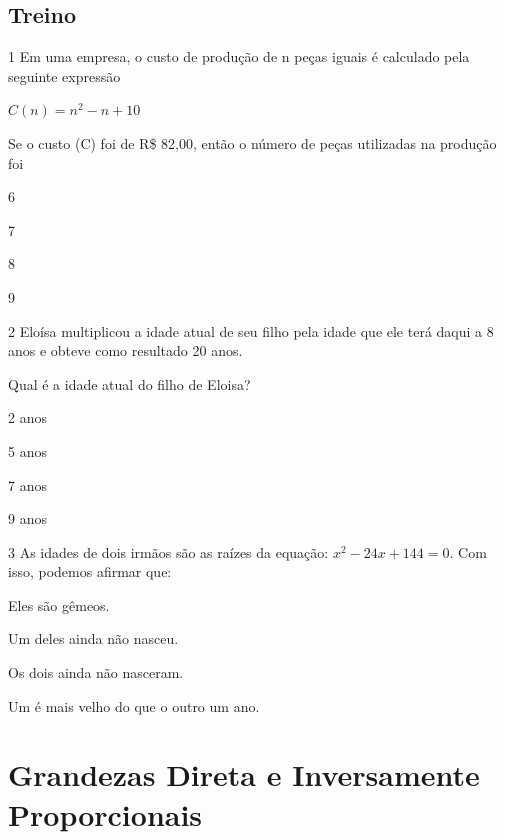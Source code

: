 \pagebreak
\section*{Treino}

\num{1} Em uma empresa, o custo de produção de n peças
iguais é calculado pela seguinte expressão 

$C(n) = n^2 - n + 10$

Se o custo (C) foi de R\$ 82,00, então o número de peças utilizadas
na produção foi

\begin{escolha}
  \item 6

  \item 7

  \item 8

  \item 9
\end{escolha}

\num{2} Eloísa multiplicou a idade atual de seu filho pela idade que ele terá
daqui a 8 anos e obteve como resultado 20 anos.

Qual é a idade atual do filho de Eloisa?

\begin{escolha}
  \item 2 anos

  \item 5 anos

  \item 7 anos

  \item 9 anos
\end{escolha}


\num{3} As idades de dois irmãos são as raízes da equação: 
$x^2 - 24x + 144 = 0$. Com isso, podemos afirmar que:

\begin{escolha}
  \item Eles são gêmeos.

  \item Um deles ainda não nasceu.

  \item Os dois ainda não nasceram.

  \item Um é mais velho do que o outro um ano.
\end{escolha}

\chapter{Grandezas Direta e Inversamente Proporcionais}

